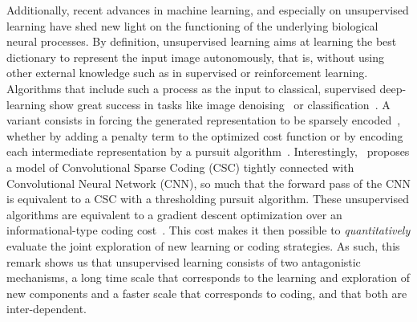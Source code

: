 \documentclass[vision,article,submit,oneauthor,pdftex]{Definitions/mdpi}
\begin{document}
Additionally, recent advances in machine learning, and especially on unsupervised learning have shed new light on the functioning of the underlying biological neural processes. By definition, unsupervised learning aims at learning the best dictionary to represent the input image autonomously, that is, without using other external knowledge such as in supervised or reinforcement learning. Algorithms that include such a process as the input to classical, supervised deep-learning show great success in tasks like image denoising~\citep{Vincent08} or classification~\citep{Sulam2017multi,PerrinetBednar15}. A variant consists in forcing the generated representation to be sparsely encoded~\citep{MakhzaniF13}, whether by adding a penalty term to the optimized cost function or by encoding each intermediate representation by a pursuit algorithm~\citep{Papyan16}. Interestingly,~\citep{Papyan16} proposes a model of Convolutional Sparse Coding (CSC) tightly connected with Convolutional Neural Network (CNN), so much that the forward pass of the CNN is equivalent to a CSC with a thresholding pursuit algorithm. These unsupervised algorithms are equivalent to a gradient descent optimization over an informational-type coding cost~\citep{Kingma13}. This cost makes it then possible to \emph{quantitatively} evaluate the joint exploration of new learning or coding strategies. As such, this remark shows us that unsupervised learning consists of two antagonistic mechanisms, a long time scale that corresponds to the learning and exploration of new components and a faster scale that corresponds to coding, and that both are inter-dependent.
\end{document}
